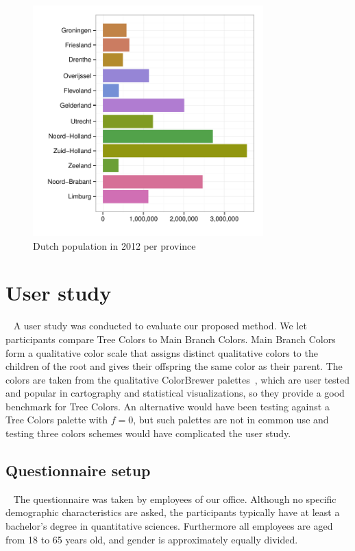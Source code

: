 \documentclass[review,journal]{vgtc}         %
\begin{document}
\begin{figure}[!b]
  \centering
  \includegraphics[width=3.5in]{pop_bar.pdf}

  \caption{Dutch population in 2012 per province}\label{fig:barApp}

\end{figure}



\section{User study}~\label{secuser}
A user study was conducted to evaluate our proposed method. We let participants compare Tree Colors to Main Branch Colors. Main Branch Colors form a qualitative color scale that assigns distinct qualitative colors to the children of the root and gives their offspring the same color as their parent. The colors are taken from the qualitative ColorBrewer palettes~\cite{brewer03}, which are user tested and popular in cartography and statistical visualizations, so they provide a good benchmark for Tree Colors. An alternative would have been testing
against a Tree Colors palette with $f=0$, but such palettes are not in common 
use and testing three colors schemes would have complicated the user study.

\subsection{Questionnaire setup}~\label{secusersetup}
The questionnaire was taken by employees of our office. %
Although no specific 
demographic characteristics are asked, the participants typically have at least a bachelor's degree in 
quantitative sciences. Furthermore all employees are aged from 18 to 65 years old, and gender is 
approximately equally divided.
\end{document}
